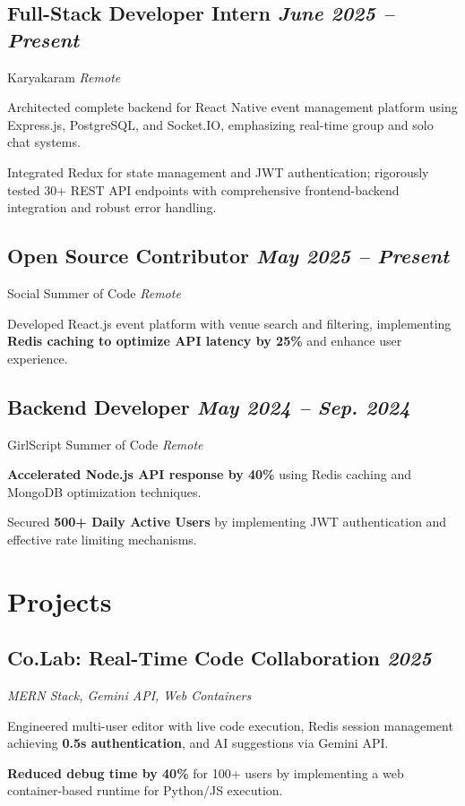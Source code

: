 \documentclass[10pt]{article}
\newcommand{\resitem}[1]{\item \RaggedRight #1}
\newcommand{\role}[1]{\textbf{#1}}
\newcommand{\company}[1]{#1}
\newcommand{\location}[1]{\textit{#1}}
\newcommand{\dates}[1]{\hfill \textit{#1}}
\begin{document}
\subsection*{\role{Full-Stack Developer Intern} \dates{June 2025 – Present}}
\company{Karyakaram} \location{Remote}
\begin{resumeitems}
    \resitem{Architected complete backend for React Native event management platform using Express.js, PostgreSQL, and Socket.IO, emphasizing real-time group and solo chat systems.}
    \resitem{Integrated Redux for state management and JWT authentication; rigorously tested 30+ REST API endpoints with comprehensive frontend-backend integration and robust error handling.}
\end{resumeitems}

\subsection*{\role{Open Source Contributor} \dates{May 2025 – Present}}
\company{Social Summer of Code} \location{Remote}
\begin{resumeitems}
    \resitem{Developed React.js event platform with venue search and filtering, implementing \textbf{Redis caching to optimize API latency by 25\%} and enhance user experience.}
\end{resumeitems}

\subsection*{\role{Backend Developer} \dates{May 2024 – Sep. 2024}}
\company{GirlScript Summer of Code} \location{Remote}
\begin{resumeitems}
    \resitem{\textbf{Accelerated Node.js API response by 40\%} using Redis caching and MongoDB optimization techniques.}
    \resitem{Secured \textbf{500+ Daily Active Users} by implementing JWT authentication and effective rate limiting mechanisms.}
\end{resumeitems}

\section*{Projects}
\subsection*{\role{Co.Lab: Real-Time Code Collaboration} \dates{2025}}
\textit{MERN Stack, Gemini API, Web Containers}
\begin{resumeitems}
    \resitem{Engineered multi-user editor with live code execution, Redis session management achieving \textbf{0.5s authentication}, and AI suggestions via Gemini API.}
    \resitem{\textbf{Reduced debug time by 40\%} for 100+ users by implementing a web container-based runtime for Python/JS execution.}
\end{resumeitems}
\end{document}
